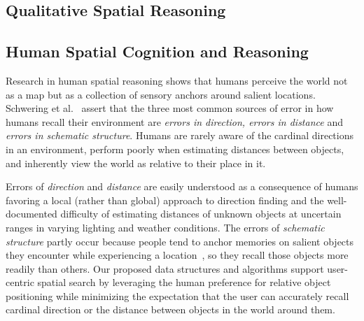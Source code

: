 \subsection{Qualitative Spatial Reasoning}



\subsection{Human Spatial Cognition and Reasoning}
\par{Research in human spatial reasoning shows that humans perceive the world not as a map but as a collection of sensory anchors around salient locations. 
Schwering et al.~\cite{Schwering2014} assert that the three most common sources of error in how humans recall their environment are \textit{errors in direction, errors in distance} and \textit{errors in schematic structure}.
Humans are rarely aware of the cardinal directions in an environment, perform poorly when estimating distances between objects, and inherently view the world as relative to their place in it.}
%
\par{Errors of \textit{direction} and \textit{distance} are easily understood as a consequence of humans favoring a local (rather than global) approach to direction finding and the well-documented difficulty of estimating distances of unknown objects at uncertain ranges in varying lighting and weather conditions. 
The errors of \textit{schematic structure} partly occur because people tend to anchor memories on salient objects they encounter while experiencing a location~\cite{Helbing2020}, so they recall those objects more readily than others.
Our proposed data structures and algorithms support user-centric spatial search by leveraging the human preference for relative object positioning while minimizing the expectation that the user can accurately recall cardinal direction or the distance between objects in the world around them.}








